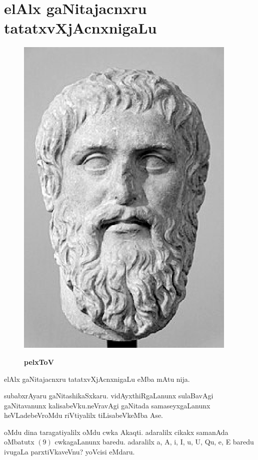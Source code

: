 \chapter{elAlx gaNitajacnxru tatatxvXjAcnxnigaLu}

\begin{figure}
\vskip -0.5cm
  \centering\includegraphics[scale=0.78]{src/figures/Plato.eps}
  
  {\bf pelxToV}
    \end{figure}
elAlx gaNitajacnxru tatatxvXjAcnxnigaLu eMba mAtu nija.

subabxrAyaru gaNitashikaSxkaru. vidAyxthiR\-gaLanunx sulaBavAgi gaNitavanunx kalisabeVku.\break neVravAgi gaNitada samaseyxgaLanunx heVLade\break beVroMdu riVtiyalilx tiLisabeVkeMba Ase.

oMdu dina taragatiyalilx oMdu cwka Akaqti. adaralilx cikakx samanAda oMbatutx $(9)$ cwkagaLanunx baredu. adaralilx a, A, i, I, u, U, Qu, e, E baredu ivugaLa parxtiVkaveVnu? yoVcisi eMdaru.

\vskip 25pt

